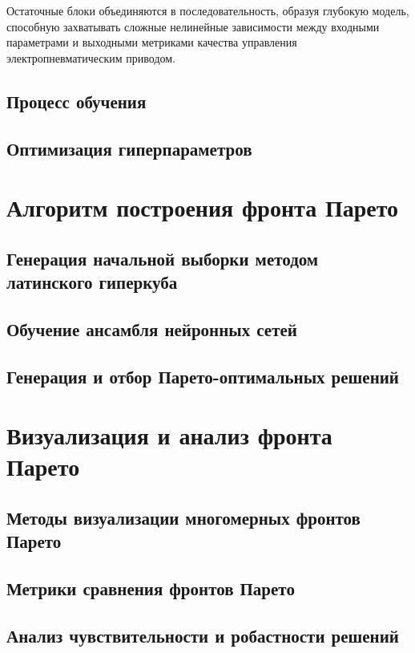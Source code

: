 Остаточные блоки объединяются в последовательность, образуя глубокую модель, способную
захватывать сложные нелинейные зависимости между входными параметрами и выходными метриками
качества управления электропневматическим приводом.

\subsection{Процесс обучения}\label{sec:ch4/sec3/subsec2}
\subsection{Оптимизация гиперпараметров}\label{sec:ch4/sec3/subsec3}

\section{Алгоритм построения фронта Парето}\label{sec:ch4/sec4}
\subsection{Генерация начальной выборки методом латинского гиперкуба}\label{sec:ch4/sec4/subsec1}
\subsection{Обучение ансамбля нейронных сетей}\label{sec:ch4/sec4/subsec2}
\subsection{Генерация и отбор Парето-оптимальных решений}\label{sec:ch4/sec4/subsec3}

\section{Визуализация и анализ фронта Парето}\label{sec:ch4/sec5}
\subsection{Методы визуализации многомерных фронтов Парето}\label{sec:ch4/sec5/subsec1}
\subsection{Метрики сравнения фронтов Парето}\label{sec:ch4/sec5/subsec2}
\subsection{Анализ чувствительности и робастности решений}\label{sec:ch4/sec5/subsec3}
